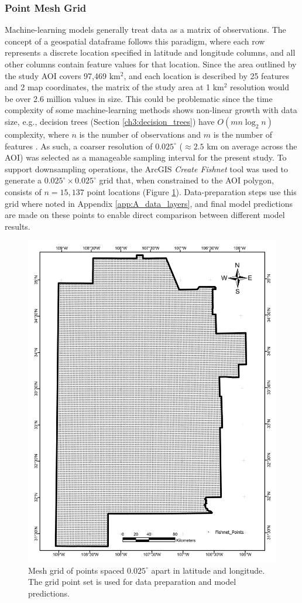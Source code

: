 \subsubsection{Point Mesh Grid}
\label{ch3:meshgrid}
Machine-learning models generally treat data as a matrix of observations. The concept of a geospatial dataframe follows this paradigm, where each row represents a discrete location specified in latitude and longitude columns, and all other columns contain feature values for that location. Since the area outlined by the study AOI covers 97,469 km$^2$, and each location is described by 25 features and 2 map coordinates, the matrix of the study area at 1 km$^2$ resolution would be over 2.6 million values in size. This could be problematic since the time complexity of some machine-learning methods shows non-linear growth with data size, e.g., decision trees (Section \ref{ch3:decision_trees}) have $O(mn\log_2n)$ complexity, where $n$ is the number of observations and $m$ is the number of features \citep{sani_computational_2018}. As such, a coarser resolution of $0.025^\circ$ ($\approx2.5$ km on average across the AOI) was selected as a manageable sampling interval for the present study. To support downsampling operations, the ArcGIS \textit{Create Fishnet} tool was used to generate a $0.025^\circ\times0.025^\circ$ grid that, when constrained to the AOI polygon, consists of $n=15,137$ point locations (Figure \ref{fig:meshgrid}). Data-preparation steps use this grid where noted in Appendix \ref{app:A_data_layers}, and final model predictions are made on these points to enable direct comparison between different model results. 

\begin{figure}
\centering
\includegraphics[width=0.75\linewidth]{templates/images/Figure-Fishnet.pdf}
\caption[Mesh grid point set]{Mesh grid of points spaced $0.025^\circ$ apart in latitude and longitude. The grid point set is used for data preparation and model predictions.} 
\label{fig:meshgrid}
\end{figure}

